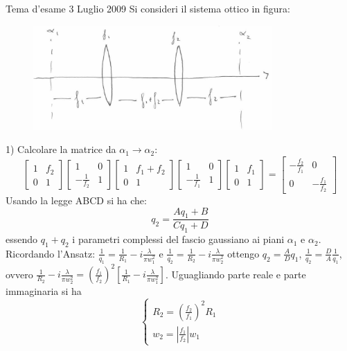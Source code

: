 \documentclass{book}
\def \l {\lambda}
\theoremstyle{remark}
\begin{document}
Tema d'esame 3 Luglio 2009
Si consideri il sistema ottico in figura:
\begin{figure}[H]
\centering
\includegraphics[height=4cm]{images/7}
\end{figure}
1) Calcolare la matrice da $\alpha_1 \rightarrow \alpha_2$:
\begin{equation*}
\begin{bmatrix}
1	&	f_2\\
0	&	1
\end{bmatrix}
\begin{bmatrix}
1	&	0\\
-\frac{1}{f_2}	&	1
\end{bmatrix}
\begin{bmatrix}
1	&	f_1 + f_2\\
0	&	1
\end{bmatrix}
\begin{bmatrix}
1	&	0\\
-\frac{1}{f_1}	&	1
\end{bmatrix}
\begin{bmatrix}
1	&	f_1\\
0	&	1
\end{bmatrix}
=
\begin{bmatrix}
-\frac{f_2}{f_1}	&	0\\
0	&	- \frac{f_1}{f_2}
\end{bmatrix}
\end{equation*}
Usando la legge ABCD si ha che:
\begin{equation*}
q_2 = \frac{Aq_1 + B}{Cq_1 + D}
\end{equation*}
essendo $q_1 + q_2$ i parametri complessi del fascio gaussiano ai piani $\alpha_1$ e $\alpha_2$.
Ricordando l'Ansatz:
$\frac{1}{q_1} = \frac{1}{R_1} -i\frac{\l}{\pi w_1^2}$ e $\frac{1}{q_2} = \frac{1}{R_2} -i\frac{\l}{\pi w_2^2}$ ottengo $q_2 = \frac{A}{D}q_1$, $\frac{1}{q_2} = \frac{D}{A}\frac{1}{q_1}$, ovvero $\frac{1}{R_2} -i\frac{\l}{\pi w_2^2} = \left(\frac{f_1}{f_2}\right)^2 \left[\frac{1}{R_1} - i\frac{\l}{\pi w_1^2}\right]$.
Uguagliando parte reale e parte immaginaria si ha
\begin{equation*}
\begin{cases}
R_2 = \left(\frac{f_2}{f_1}\right)^2 R_1\\
w_2 = \left|\frac{f_1}{f_2}\right|w_1
\end{cases}
\end{equation*}
\end{document}
